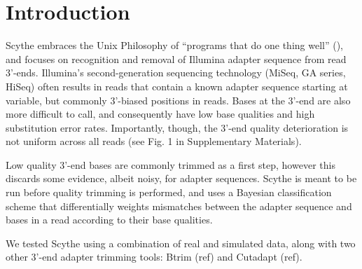 \documentclass{bioinfo}
\begin{document}
\section{Introduction}
Scythe embraces the Unix Philosophy of ``programs that do one thing
well'' (\citealp{gancarz1995}), and focuses on recognition and removal
of Illumina adapter sequence from read 3'-ends. Illumina's
second-generation sequencing technology (MiSeq, GA series, HiSeq)
often results in reads that contain a known adapter sequence starting
at variable, but commonly 3'-biased positions in reads. Bases at the
3'-end are also more difficult to call, and consequently have low base
qualities and high substitution error rates. Importantly, though, the
3'-end quality deterioration is not uniform across all reads (see
Fig. 1 in Supplementary Materials).

Low quality 3'-end bases are commonly trimmed as a first step, however
this discards some evidence, albeit noisy, for adapter
sequences. Scythe is meant to be run before quality trimming is
performed, and uses a Bayesian classification scheme that
differentially weights mismatches between the adapter sequence and
bases in a read according to their base qualities.

We tested Scythe using a combination of real and simulated data, along
with two other 3'-end adapter trimming tools: Btrim (ref) and Cutadapt
(ref).


\end{document}
